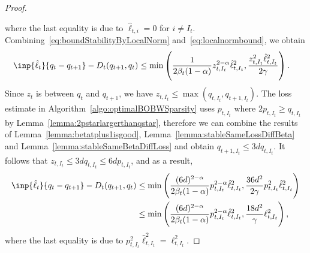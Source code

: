 \begin{proof}
\begin{nalign}
        \label{eq:localnormbound}
    \end{nalign}
    where the last equality is due to $\hat{\ell}_{t,i} = 0$ for $i \neq I_t$. Combining~\eqref{eq:boundStabilityByLocalNorm} and~\eqref{eq:localnormbound}, we obtain
    \begin{align}
        \inp{\hat{\ell}_t}{q_{t}  - q_{t+1}} - D_t(q_{t+1}, q_t) 
        &\leq \min\left(\frac{1}{2\beta_t(1-\alpha)} z_{t,I_t}^{2-\alpha}\hat{\ell}_{t,I_t}^2, \frac{z_{t,I_t}^2\hat{\ell}_{t,I_t}^2}{2\gamma} \right).
    \end{align}
    Since $z_t$ is between $q_{t}$ and $q_{t+1}$, we have $z_{t,I_t} \leq \max(q_{t, I_t}, q_{t+1,I_t})$. 
    The loss estimate in Algorithm~\ref{algo:optimalBOBWSparsity} uses $p_{t,I_t}$ where $2p_{t,I_t} \geq q_{t,I_t}$ by Lemma~\ref{lemma:2pstarlargerthanqstar}, therefore we can combine the results of Lemma~\ref{lemma:betatplus1isgood}, Lemma~\ref{lemma:stableSameLossDiffBeta} and Lemma~\ref{lemma:stableSameBetaDiffLoss} and obtain $q_{t+1, I_t} \leq 3dq_{t,I_t}$. It follows that $z_{t, I_t} \leq 3dq_{t,I_t}  \leq 6dp_{t,I_t}$, and as a result,
    \begin{align}
        \inp{\hat{\ell}_t}{q_{t}  - q_{t+1}} - D_t(q_{t+1}, q_t) &\leq \min\left(\frac{(6d)^{2-\alpha}}{2\beta_t(1-\alpha)} p_{t,I_t}^{2-\alpha}\hat{\ell}_{t,I_t}^2, \frac{36d^2}{2\gamma} p_{t,I_t}^2 \hat{\ell}_{t,I_t}^2 \right) \\
        &\leq \min\left( \frac{(6d)^{2-\alpha}}{2\beta_t(1-\alpha)}p_{t,I_t}^{2-\alpha}\hat{\ell}^2_{t,I_t}, \frac{18d^2}{\gamma} \ell_{t,I_t}^2  \right),
    \end{align}
    where the last equality is due to $p_{t,I_t}^2\hat{\ell}_{t,I_t}^2 = \ell_{t,I_t}^2$.
\end{proof}

